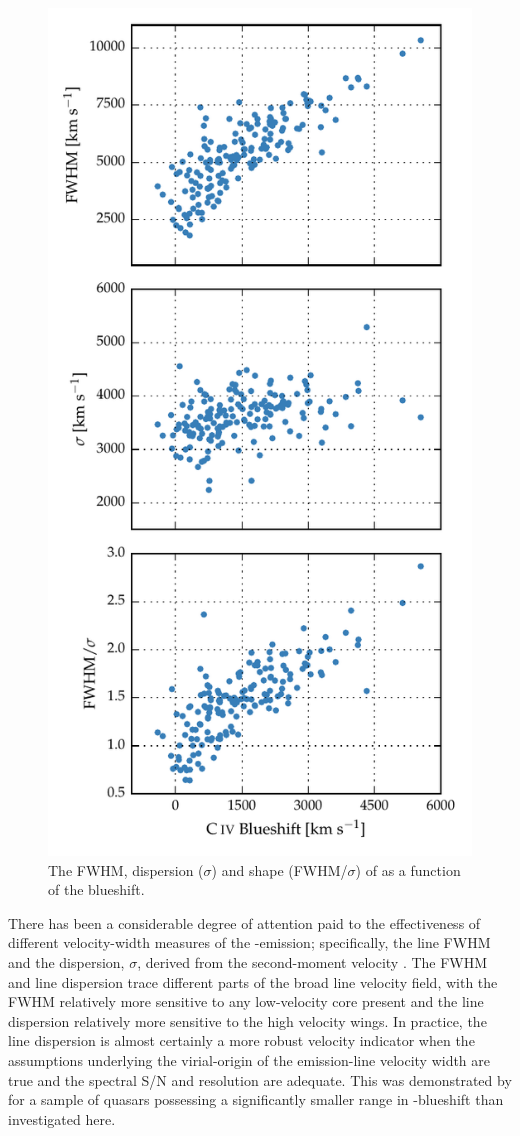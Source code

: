 \begin{figure}
    \centering 
    \includegraphics[width=0.8\linewidth]{figures/chapter03/civ_comparisons_paper2.pdf} 
    \caption{The FWHM, dispersion ($\sigma$) and shape (FWHM/$\sigma$) of  as a function of the  blueshift.}
    \label{fig:line_comparison_civ}
\end{figure} 

There has been a considerable degree of attention paid to the effectiveness of different velocity-width measures of the -emission; specifically, the line FWHM and the dispersion, $\sigma$, derived from the second-moment velocity \citep[e.g.][]{assef11, denney13}.
The FWHM and line dispersion trace different parts of the broad line velocity field, with the FWHM relatively more sensitive to any low-velocity core present and the line dispersion relatively more sensitive to the high velocity wings. 
In practice, the line dispersion is almost certainly a more robust velocity indicator when the assumptions underlying the virial-origin of the emission-line velocity width are true and the spectral S/N and resolution are adequate.
This was demonstrated by \citet{denney13} for a sample of quasars possessing a significantly smaller range in -blueshift than investigated here.

